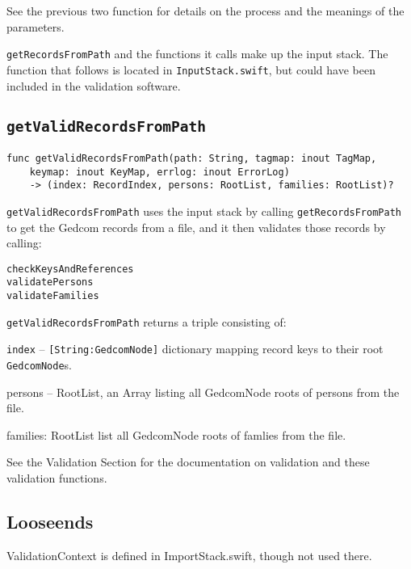See the previous two function for details on the process and the
meanings of the parameters.

\texttt{getRecordsFromPath} and the functions it calls make up
the input stack.
The function that follows is located in
\texttt{InputStack.swift}, but could
have been included in the validation software.


%
%

\subsection{\texttt{getValidRecordsFromPath}}
\begin{verbatim}
func getValidRecordsFromPath(path: String, tagmap: inout TagMap,
    keymap: inout KeyMap, errlog: inout ErrorLog)
    -> (index: RecordIndex, persons: RootList, families: RootList)?
\end{verbatim}
\texttt{getValidRecordsFromPath} uses the input stack by calling
\texttt{getRecordsFromPath} to get the Gedcom
records from a file, and it then validates those records by
calling:
\begin{verbatim}
checkKeysAndReferences
validatePersons
validateFamilies
\end{verbatim}

\texttt{getValidRecordsFromPath} returns a triple consisting of:

\texttt{index} -- \texttt{[String:GedcomNode]} dictionary mapping
record keys to their root \texttt{GedcomNode}s.

persons -- RootList, an Array listing all GedcomNode roots of
persons from the file.

families: RootList list all GedcomNode roots of famlies
from the file.

See the Validation Section for the documentation on validation and
these validation functions.





\subsection{Looseends}
ValidationContext is defined in ImportStack.swift, though not
used there.